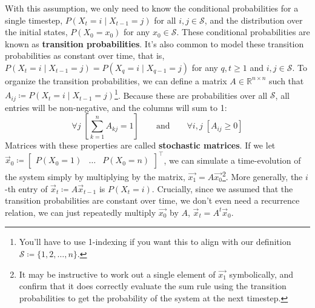 With this assumption, we only need to know the conditional probabilities for a single timestep, $P(X_{t} = i \mid X_{t - 1} = j)$ for all $i, j \in \mathcal{S}$, and the distribution over the initial states, $P(X_0 = x_0)$ for any $x_0 \in \mathcal{S}$. These conditional probabilities are known as \textbf{transition probabilities}. It's also common to model these transition probabilities as constant over time, that is, $P(X_{t} = i \mid X_{t - 1} = j) = P(X_{q} = i \mid X_{q - 1} = j)$ for any $q, t \geq 1$ and $i, j \in \mathcal{S}$. To organize the transition probabilities, we can define a matrix $A \in \mathbb{R}^{n \times n}$ such that $A_{ij} \coloneq P(X_{t} = i \mid X_{t - 1} = j)$\footnote{You'll have to use 1-indexing if you want this to align with our definition $\mathcal{S} \coloneq \{1, 2, \dots, n\}$.}. Because these are probabilities over all $\mathcal{S}$, all entries will be non-negative, and the columns will sum to 1:
$$ \forall j \; \left[ \sum_{k = 1}^n A_{kj} = 1 \right] \qquad \text{and} \qquad \forall i,j\; \left[ A_{ij} \geq 0 \right] $$
Matrices with these properties are called \textbf{stochastic matrices}. If we let $\vec{x}_0 \coloneq \begin{bmatrix}P(X_0 = 1) & \dots & P(X_0 = n)\end{bmatrix}^\top$, we can simulate a time-evolution of the system simply by multiplying by the matrix, $\vec{x_1}=A\vec{x_0}$\footnote{It may be instructive to work out a single element of $\vec{x_1}$ symbolically, and confirm that it does correctly evaluate the sum rule using the transition probabilities to get the probability of the system at the next timestep.}. More generally, the $i$-th entry of $\vec{x}_t \coloneq A\vec{x}_{t - 1}$ is $P(X_t = i)$. Crucially, since we assumed that the transition probabilities are constant over time, we don't even need a recurrence relation, we can just repeatedly multiply $\vec{x_0}$ by $A$, $\vec{x}_t = A^t\vec{x}_0$.

